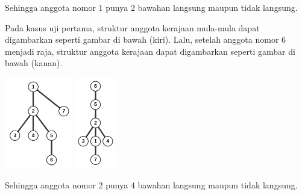 \documentclass{article}
\begin{document}
Sehingga anggota nomor 1 punya 2 bawahan langsung maupun tidak langsung.

Pada kasus uji pertama, struktur anggota kerajaan mula-mula dapat digambarkan seperti gambar di bawah (kiri). Lalu, setelah anggota nomor 6 menjadi raja, struktur anggota kerajaan dapat digambarkan seperti gambar di bawah (kanan).

\includegraphics[height=150px]{sample-2-1}
\includegraphics[height=150px]{sample-2-2}

Sehingga anggota nomor 2 punya 4 bawahan langsung maupun tidak langsung.
\end{document}
